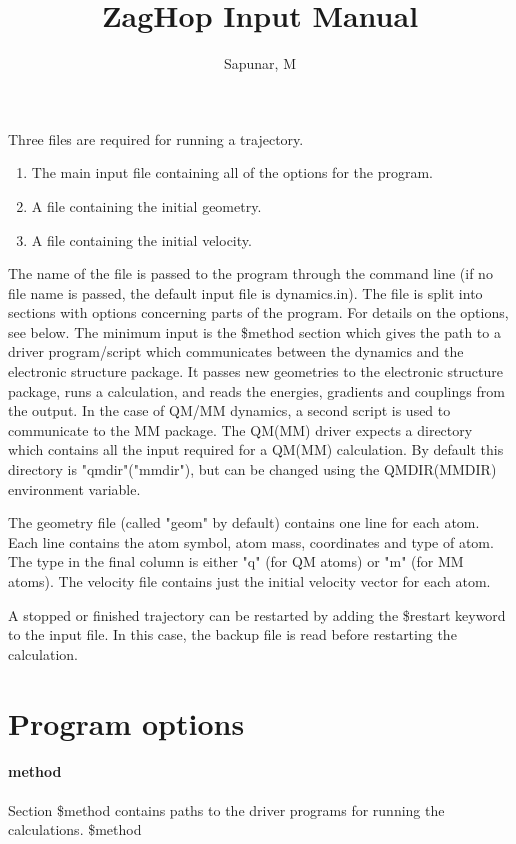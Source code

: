 \documentclass{report}
\title{ZagHop Input Manual}
\author{Sapunar, M}
\begin{document}
\maketitle

Three files are required for running a trajectory. 
\begin{enumerate} 
	\item The main input file containing all of the options for the program.
	\item A file containing the initial geometry.
	\item A file containing the initial velocity.
\end{enumerate}

The name of the file is passed to the program through the command line (if no file name is passed, the default input file is dynamics.in). The file is split into sections with options concerning parts of the program. For details on the options, see below. The minimum input is the \$method section which gives the path to a driver program/script which communicates between the dynamics and the electronic structure package. It passes new geometries to the electronic structure package, runs a calculation, and reads the energies, gradients and couplings from the output. In the case of QM/MM dynamics, a second script is used to communicate to the MM package. The QM(MM) driver expects a directory which contains all the input required for a QM(MM) calculation. By default this directory is "qmdir"("mmdir"), but can be changed using the QMDIR(MMDIR) environment variable.

The geometry file (called "geom" by default) contains one line for each atom. Each line contains the atom symbol, atom mass, coordinates and type of atom. The type in the final column is either "q" (for QM atoms) or "m" (for MM atoms). The velocity file contains just the initial velocity vector for each atom.

A stopped or finished trajectory can be restarted by adding the \$restart keyword to the input file. In this case, the backup file is read before restarting the calculation.

\section*{Program options}
\paragraph{method}
Section \$method contains paths to the driver programs for running the calculations.  \newline
\$method
\end{document}
